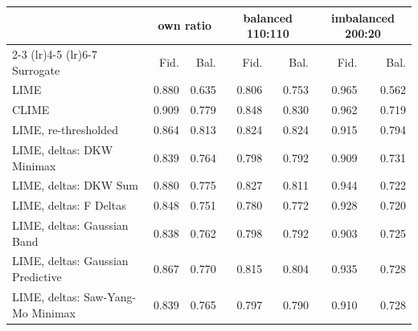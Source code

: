 \begin{tabular}{@{}lrrrrrr@{}}
  \toprule
   & \multicolumn{2}{c}{own ratio} & \multicolumn{2}{c}{balanced 110:110} & \multicolumn{2}{c}{imbalanced 200:20} \\
  \cmidrule(lr){2-3} \cmidrule(lr){4-5} \cmidrule(lr){6-7}
  Surrogate & Fid. & Bal. & Fid. & Bal. & Fid. & Bal. \\
  \midrule
  LIME & 0.880 & 0.635 & 0.806 & 0.753 & 0.965 & 0.562 \\
  CLIME & 0.909 & 0.779 & 0.848 & 0.830 & 0.962 & 0.719 \\
  LIME, re-thresholded & 0.864 & 0.813 & 0.824 & 0.824 & 0.915 & 0.794 \\
  LIME, deltas: DKW Minimax & 0.839 & 0.764 & 0.798 & 0.792 & 0.909 & 0.731 \\
  LIME, deltas: DKW Sum & 0.880 & 0.775 & 0.827 & 0.811 & 0.944 & 0.722 \\
  LIME, deltas: F Deltas & 0.848 & 0.751 & 0.780 & 0.772 & 0.928 & 0.720 \\
  LIME, deltas: Gaussian Band & 0.838 & 0.762 & 0.798 & 0.792 & 0.903 & 0.725 \\
  LIME, deltas: Gaussian Predictive & 0.867 & 0.770 & 0.815 & 0.804 & 0.935 & 0.728 \\
  LIME, deltas: Saw-Yang-Mo Minimax & 0.839 & 0.765 & 0.797 & 0.790 & 0.910 & 0.728 \\
  \bottomrule
\end{tabular}
